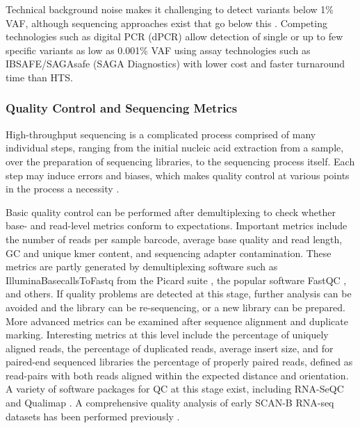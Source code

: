 \documentclass[11pt]{book}
\newcommand{\scanb}{\mbox{SCAN-B}}
\begin{document}
Technical background noise makes it challenging to detect variants below 1\% VAF, although sequencing approaches exist that go below this \cite{Stahlberg:2016, Stasik:2018}. Competing technologies such as digital PCR (dPCR) allow detection of single or up to few specific variants as low as 0.001\% VAF using assay technologies such as IBSAFE/SAGAsafe (SAGA Diagnostics) \cite{Arildsen:2019, Fornvik:2019, Isaksson:2019, Pettersson:2020} with lower cost and faster turnaround time than HTS.


\subsubsection*{Quality Control and Sequencing Metrics}

High-throughput sequencing is a complicated process comprised of many individual steps, ranging from the initial nucleic acid extraction from a sample, over the preparation of sequencing libraries, to the sequencing process itself. Each step may induce errors and biases, which makes quality control at various points in the process a necessity \cite{Sheng:2017}.

Basic quality control can be performed after demultiplexing to check whether base- and read-level metrics conform to expectations. Important metrics include the number of reads per sample barcode, average base quality and read length, GC and unique kmer content, and sequencing adapter contamination. These metrics are partly generated by demultiplexing software such as IlluminaBasecallsToFastq from the Picard suite \cite{picard}, the popular software FastQC \cite{fastqc}, and others. If quality problems are detected at this stage, further analysis can be avoided and the library can be re-sequencing, or a new library can be prepared. More advanced metrics can be examined after sequence alignment and duplicate marking. Interesting metrics at this level include the percentage of uniquely aligned reads, the percentage of duplicated reads, average insert size, and for paired-end sequenced libraries the percentage of properly paired reads, defined as read-pairs with both reads aligned within the expected distance and orientation. A variety of software packages for QC at this stage exist, including RNA-SeQC and Qualimap \cite{DeLuca:2012, Okonechnikov:2016}. A comprehensive quality analysis of early \scanb{} RNA-seq datasets has been performed previously \cite{Brueffer:2013}.
\end{document}
